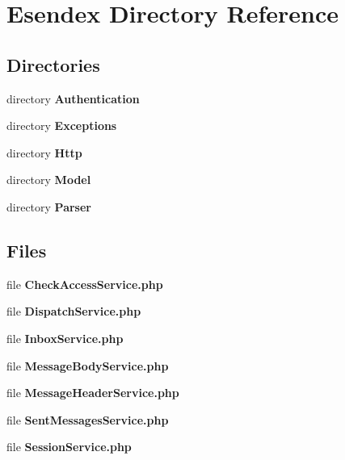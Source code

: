 \section{Esendex Directory Reference}
\label{dir_0b2405619fc5f649aa734e81a34745d0}
\subsection*{Directories}
\begin{DoxyCompactItemize}
\item 
directory {\bf Authentication}
\item 
directory {\bf Exceptions}
\item 
directory {\bf Http}
\item 
directory {\bf Model}
\item 
directory {\bf Parser}
\end{DoxyCompactItemize}
\subsection*{Files}
\begin{DoxyCompactItemize}
\item 
file {\bfseries Check\-Access\-Service.\-php}
\item 
file {\bfseries Dispatch\-Service.\-php}
\item 
file {\bfseries Inbox\-Service.\-php}
\item 
file {\bfseries Message\-Body\-Service.\-php}
\item 
file {\bfseries Message\-Header\-Service.\-php}
\item 
file {\bfseries Sent\-Messages\-Service.\-php}
\item 
file {\bfseries Session\-Service.\-php}
\end{DoxyCompactItemize}
